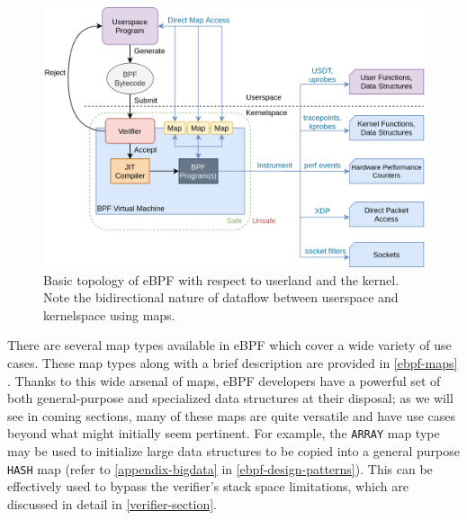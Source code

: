 \documentclass[
  12pt]{findlay}
\begin{document}
\begin{figure}
\includegraphics{../figures/ebpf-arch.png}
\caption[Basic topology of eBPF with respect to userland and the kernel]{
Basic topology of eBPF with respect to userland and the kernel.
Note the bidirectional nature of dataflow between userspace and kernelspace
using maps.}
\label{ebpf-topology}
\end{figure}

There are several map types available in eBPF which cover a wide variety
of use cases. These map types along with a brief description are
provided in \autoref{ebpf-maps} \autocite{man-bpf,fleming17,bcc}. Thanks
to this wide arsenal of maps, eBPF developers have a powerful set of
both general-purpose and specialized data structures at their disposal;
as we will see in coming sections, many of these maps are quite
versatile and have use cases beyond what might initially seem pertinent.
For example, the \passthrough{\lstinline!ARRAY!} map type may be used to
initialize large data structures to be copied into a general purpose
\passthrough{\lstinline!HASH!} map (refer to \autoref{appendix-bigdata}
in \autoref{ebpf-design-patterns}). This can be effectively used to
bypass the verifier's stack space limitations, which are discussed in
detail in \autoref{verifier-section}.
\end{document}
